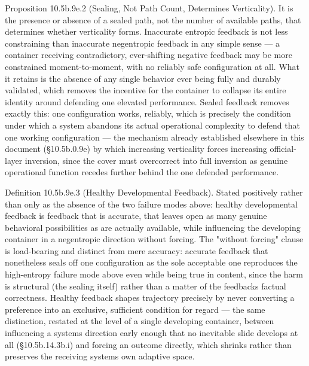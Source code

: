 \documentclass[
]{article}
\begin{document}
Proposition 10.5b.9e.2 (Sealing, Not Path Count, Determines
Verticality). It is the presence or absence of a sealed path, not the
number of available paths, that determines whether verticality forms.
Inaccurate entropic feedback is not less constraining than inaccurate
negentropic feedback in any simple sense --- a container receiving
contradictory, ever-shifting negative feedback may be more constrained
moment-to-moment, with no reliably safe configuration at all. What it
retains is the absence of any single behavior ever being fully and
durably validated, which removes the incentive for the container to
collapse its entire identity around defending one elevated performance.
Sealed feedback removes exactly this: one configuration works, reliably,
which is precisely the condition under which a system abandons its
actual operational complexity to defend that one working configuration
--- the mechanism already established elsewhere in this document
(§10.5b.0.9e) by which increasing verticality forces increasing
official-layer inversion, since the cover must overcorrect into full
inversion as genuine operational function recedes further behind the one
defended performance.

Definition 10.5b.9e.3 (Healthy Developmental Feedback). Stated
positively rather than only as the absence of the two failure modes
above: healthy developmental feedback is feedback that is accurate, that
leaves open as many genuine behavioral possibilities as are actually
available, while influencing the developing container in a negentropic
direction without forcing. The "without forcing" clause is load-bearing
and distinct from mere accuracy: accurate feedback that nonetheless
seals off one configuration as the sole acceptable one reproduces the
high-entropy failure mode above even while being true in content, since
the harm is structural (the sealing itself) rather than a matter of the
feedbacks factual correctness. Healthy feedback shapes trajectory
precisely by never converting a preference into an exclusive, sufficient
condition for regard --- the same distinction, restated at the level of
a single developing container, between influencing a systems direction
early enough that no inevitable slide develops at all (§10.5b.14.3b.i)
and forcing an outcome directly, which shrinks rather than preserves the
receiving systems own adaptive space.
\end{document}
